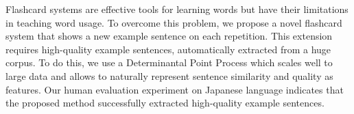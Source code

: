 Flashcard systems are effective tools for learning words but have their limitations in teaching word usage. To overcome this problem, we propose a novel flashcard system that shows a new example sentence on each repetition. This extension requires high-quality example sentences, automatically extracted from a huge corpus. To do this, we use a Determinantal Point Process which scales well to large data and allows to naturally represent sentence similarity and quality as features. Our human evaluation experiment on Japanese language indicates that the proposed method successfully extracted high-quality example sentences.

